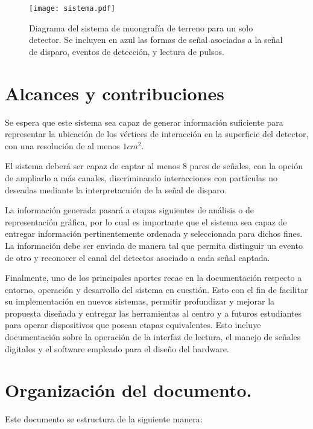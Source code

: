 	\begin{figure}[t]
		\centering
		\texttt{[image: sistema.pdf]}
		\caption{Diagrama del sistema de muongrafía de terreno para un solo detector. Se incluyen en azul las formas de señal asociadas a la señal de disparo, eventos de detección, y lectura de pulsos.}
		\label{img:sistema}
	\end{figure}						

\section{Alcances y contribuciones}

	Se espera que este sistema sea capaz de generar información suficiente para representar la ubicación de los vértices de interacción en la superficie del detector, con una resolución de al menos $1cm^2$.
	
	El sistema deberá ser capaz de captar al menos 8 pares de señales, con la opción de ampliarlo a más canales, discriminando interacciones con partículas no deseadas mediante la interpretacuión de la señal de disparo.
	
	La información generada pasará a etapas siguientes de análisis o de representación gráfica, por lo cual es importante que el sistema sea capaz de entregar información pertinentemente ordenada y seleccionada para dichos fines. La información debe ser enviada de manera tal que permita distinguir un evento de otro y reconocer el canal del detectos asociado a cada señal captada.
	
	Finalmente, uno de los principales aportes recae en la documentación respecto a entorno, operación y desarrollo del sistema en cuestión. Esto con el fin de facilitar su implementación en nuevos sistemas, permitir profundizar y mejorar la propuesta diseñada y entregar las herramientas al centro y a futuros estudiantes para operar dispositivos que posean etapas equivalentes. Esto incluye documentación sobre la operación de la interfaz de lectura, el manejo de señales digitales y el software empleado para el diseño del hardware.  


\section{Organización del documento.}

	Este documento se estructura de la siguiente manera:
	
